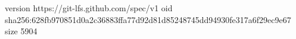 version https://git-lfs.github.com/spec/v1
oid sha256:628fb970851d0a2c36883ffa77d92d81d85248745dd94930fe317a6f29ec9e67
size 5904
